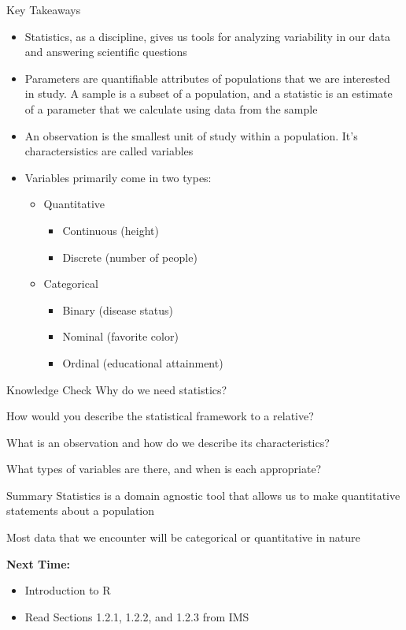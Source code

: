 \documentclass{beamer}
\begin{document}
\begin{frame}{Key Takeaways}

\begin{itemize}
\item Statistics, as a discipline, gives us tools for analyzing variability in our data and answering scientific questions
\item Parameters are quantifiable attributes of populations that we are interested in study. A sample is a subset of a population, and a statistic is an estimate of a parameter that we calculate using data from the sample
\item An observation is the smallest unit of study within a population. It's charactersistics are called variables
\item Variables primarily come in two types:
\begin{itemize}
\item Quantitative
\begin{itemize}
\item Continuous (height)
\item Discrete (number of people)
\end{itemize}
\item Categorical
\begin{itemize}
\item Binary (disease status)
\item Nominal (favorite color)
\item Ordinal (educational attainment)
\end{itemize}
\end{itemize}
\end{itemize}

\end{frame}

\begin{frame}{Knowledge Check}
Why do we need statistics? \vspace{3mm}

How would you describe the statistical framework to a relative? \vspace{3mm}

What is an observation and how do we describe its characteristics? \vspace{3mm}

What types of variables are there, and when is each appropriate?
\end{frame}

\begin{frame}{Summary}
Statistics is a domain agnostic tool that allows us to make quantitative statements about a population \vspace{3mm}

Most data that we encounter will be categorical or quantitative in nature \vspace{4mm}

\textbf{Next Time:}
\begin{itemize}
\item Introduction to R
\item Read Sections 1.2.1, 1.2.2, and 1.2.3 from IMS
\end{itemize}
\end{frame}
\end{document}
